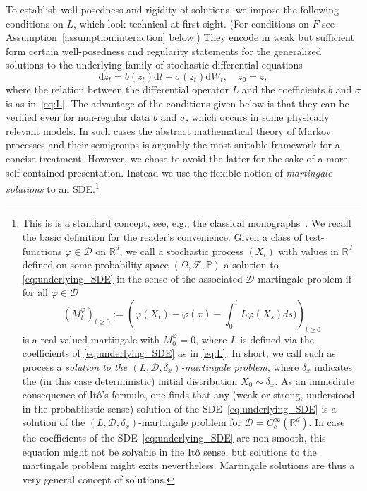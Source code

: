 \documentclass{article}
\newcommand{\dd}{\text{d}}
\newcommand{\R}{\mathbb{R}}
\newcommand{\F}{F}
\begin{document}
To establish well-posedness and rigidity of solutions, we impose the following conditions on $L$, which look
technical at first sight.  (For conditions on $\F$ see Assumption~\ref{assumption:interaction} below.) They
encode in weak but sufficient form certain well-posedness and regularity statements for the generalized
solutions to the underlying family of stochastic differential equations
\begin{equation}
     \dd z_t= b(z_t) \dd t+ \sigma(z_t) \dd W_{t},\quad  z_0=z,\label{eq:underlying_SDE} 
\end{equation}
where the relation between the differential operator $L$ and the coefficients $b$ and $\sigma$ is as
in~\eqref{eq:L}.  The advantage of the conditions given below is that they can be verified even for
non-regular data $b$ and $\sigma$, which occurs in some physically relevant models. In such cases the abstract
mathematical theory of Markov processes and their semigroups is arguably the most suitable framework for a
concise treatment. However, we chose to avoid the latter for the sake of a more self-contained
presentation. Instead we use the flexible notion of \textit{martingale solutions} to an SDE.\footnote{This is
  is a standard concept, see, e.g., the classical monographs~\cite{Ethier1986a,Stroock2006a}. We recall the
  basic definition for the reader's convenience. Given a class of test-functions $\varphi \in \mathcal D$ on
  $\R^d$, we call a stochastic process $(X_t)$ with values in $\R^d$ defined on some probability space
  $(\Omega, \mathcal F, \mathbb P)$ a solution to \eqref{eq:underlying_SDE} in the sense of the associated
  $\mathcal D$-martingale problem if for all $\varphi \in \mathcal D$
  \[ \left(M_t^\varphi\right)_{t\geq 0}:=\left(\varphi (X_t) - \varphi(x)- \int_{0}^{t} L \varphi(X_s)
      ds)\right)_{t\geq 0} \] is a real-valued martingale with $M_0^\varphi=0$, where $L$ is defined via the
  coefficients of \eqref{eq:underlying_SDE} as in \eqref{eq:L}. In short, we call such as process a
  \emph{solution to the $(L, \mathcal D, \delta_x)$-martingale problem}, where $\delta_x$ indicates the (in
  this case deterministic) initial distribution $X_0\sim \delta_x$. As an immediate consequence of It\^o's
  formula, one finds that any (weak or strong, understood in the probabilistic sense) solution of the
  SDE~\eqref{eq:underlying_SDE} is a solution of the $(L, \mathcal D, \delta_x)$-martingale problem for
  $\mathcal D= C_c^\infty(\R^d)$.  In case the coefficients of the SDE~\eqref{eq:underlying_SDE} are
  non-smooth, this equation might not be solvable in the It\^o sense, but solutions to the martingale problem
  might exits nevertheless. Martingale solutions are thus a very general concept of solutions.}
\end{document}

